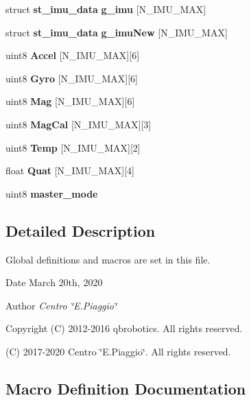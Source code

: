 \begin{DoxyCompactItemize}
\item 
\mbox{\label{globals_8h_ab72cce926a6439eda41315f45a9c379c}} 
struct \textbf{ st\+\_\+imu\+\_\+data} {\bfseries g\+\_\+imu} [N\+\_\+\+I\+M\+U\+\_\+\+M\+AX]
\item 
\mbox{\label{globals_8h_abb00fd907d732c0691940f718e231178}} 
struct \textbf{ st\+\_\+imu\+\_\+data} {\bfseries g\+\_\+imu\+New} [N\+\_\+\+I\+M\+U\+\_\+\+M\+AX]
\item 
\mbox{\label{globals_8h_a187c605f3898cf11e09f6f469c265920}} 
uint8 {\bfseries Accel} [N\+\_\+\+I\+M\+U\+\_\+\+M\+AX][6]
\item 
\mbox{\label{globals_8h_a49dba88a31d1b3b4190065b9ef1649fe}} 
uint8 {\bfseries Gyro} [N\+\_\+\+I\+M\+U\+\_\+\+M\+AX][6]
\item 
\mbox{\label{globals_8h_a5d88408ccb73729f049a52b4d1daaadf}} 
uint8 {\bfseries Mag} [N\+\_\+\+I\+M\+U\+\_\+\+M\+AX][6]
\item 
\mbox{\label{globals_8h_a1e598e1bdae5fe927fbd1f396161f3a6}} 
uint8 {\bfseries Mag\+Cal} [N\+\_\+\+I\+M\+U\+\_\+\+M\+AX][3]
\item 
\mbox{\label{globals_8h_af5f2d49e123a057d358297a34194ebdc}} 
uint8 {\bfseries Temp} [N\+\_\+\+I\+M\+U\+\_\+\+M\+AX][2]
\item 
\mbox{\label{globals_8h_a79179edea7394e7176f8768b1b0f6f92}} 
float {\bfseries Quat} [N\+\_\+\+I\+M\+U\+\_\+\+M\+AX][4]
\item 
uint8 \textbf{ master\+\_\+mode}
\end{DoxyCompactItemize}


\subsection{Detailed Description}
Global definitions and macros are set in this file. 

\begin{DoxyDate}{Date}
March 20th, 2020 
\end{DoxyDate}
\begin{DoxyAuthor}{Author}
{\itshape Centro \char`\"{}\+E.\+Piaggio\char`\"{}} 
\end{DoxyAuthor}
\begin{DoxyCopyright}{Copyright}
(C) 2012-\/2016 qbrobotics. All rights reserved. 

(C) 2017-\/2020 Centro \char`\"{}\+E.\+Piaggio\char`\"{}. All rights reserved. 
\end{DoxyCopyright}


\subsection{Macro Definition Documentation}
\mbox{\label{globals_8h_a66edaed675ab232f06a4e5b3c30d101a}} 
